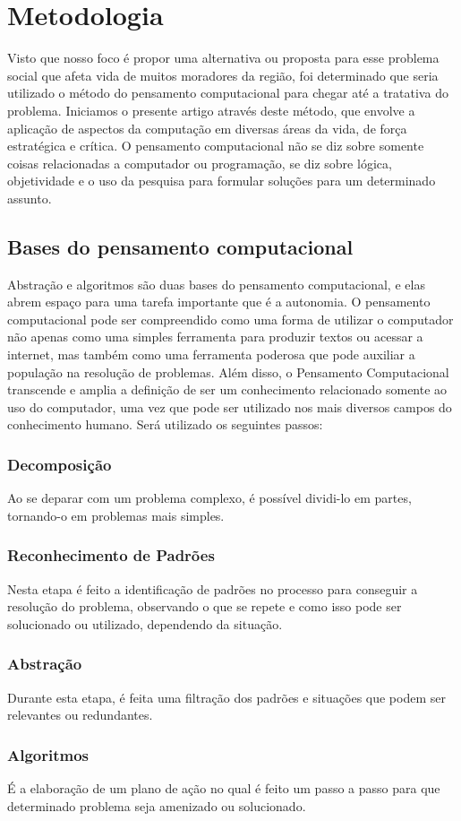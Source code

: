 \section{Metodologia}

Visto que nosso foco é propor uma alternativa ou proposta para esse problema
social que afeta vida de muitos moradores da região, foi determinado 
que seria utilizado o método do pensamento computacional para chegar até a 
tratativa do problema. Iniciamos o presente artigo através deste método, que 
envolve a aplicação de aspectos da computação em diversas áreas da vida, de força 
estratégica e crítica. O pensamento computacional não se diz sobre somente coisas 
relacionadas a computador ou programação, se diz sobre lógica, objetividade e o 
uso da pesquisa para formular soluções para um determinado assunto.

\subsection{Bases do pensamento computacional}

Abstração e algoritmos são duas bases do pensamento computacional, e elas 
abrem espaço para uma tarefa importante que é a autonomia. O pensamento 
computacional pode ser compreendido como uma forma de utilizar o 
computador não apenas como uma simples ferramenta para produzir textos ou 
acessar a internet, mas também como uma ferramenta poderosa que pode 
auxiliar a população na resolução de problemas. Além disso, o 
Pensamento Computacional transcende e amplia a definição de ser um 
conhecimento relacionado somente ao uso do computador, uma vez que pode 
ser utilizado nos mais diversos campos do conhecimento humano. Será utilizado
os seguintes passos:

\subsubsection{Decomposição}
Ao se deparar com um problema complexo, é possível dividi-lo em partes,
tornando-o em problemas mais simples.

\subsubsection{Reconhecimento de Padrões}
Nesta etapa é feito a identificação de padrões no processo para conseguir a
resolução do problema, observando o que se repete e como isso pode ser 
solucionado ou utilizado, dependendo da situação. 

\subsubsection{Abstração}
Durante esta etapa, é feita uma filtração dos padrões e situações que podem 
ser relevantes ou redundantes. 

\subsubsection{Algoritmos}
É a elaboração de um plano de ação no qual é feito um passo a passo para que 
determinado problema seja amenizado ou solucionado.